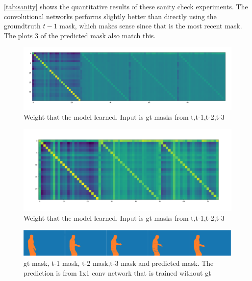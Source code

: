 \ref{tab:sanity} shows the quantitative results of these sanity check experiments. The convolutional networks performs slightly better than directly using the groundtruth $t-1$ mask, which makes sense since that is the most recent mask. The plots \ref{fig:plot1} of the predicted mask also match this.

\begin{figure}
\centering
\includegraphics[scale=0.22]{fig/weights_4.png}
\caption{Weight that the model learned. Input is gt masks from t,t-1,t-2,t-3}
\label{fig:w4}
\end{figure}
\begin{figure}
\centering
\includegraphics[scale=0.22]{fig/weights_3.png}
\caption{Weight that the model learned. Input is gt masks from t,t-1,t-2,t-3}
\label{fig:w3}
\end{figure}

\begin{figure}
\centering
\includegraphics[scale=0.23]{fig/pred.png}
\caption{gt mask, t-1 mask, t-2 mask,t-3 mask and predicted mask. The prediction is from 1x1 conv network that is trained without gt}
\label{fig:plot1}
\end{figure}




